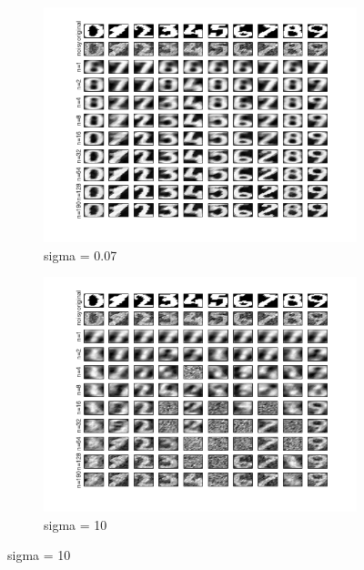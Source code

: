 \documentclass[11pt,oneside,a4paper]{article}
\begin{document}
\begin{figure}[H]
\begin{subfigure}[b]{0.4\textwidth}
		\includegraphics[width=\textwidth]{../Figures/07}
		\caption{sigma = 0.07}
	\end{subfigure}
	\begin{subfigure}[b]{0.4\textwidth}
		\includegraphics[width=\textwidth]{../Figures/10}
		\caption{sigma = 10}
	\end{subfigure}
\end{figure}
\end{document}

